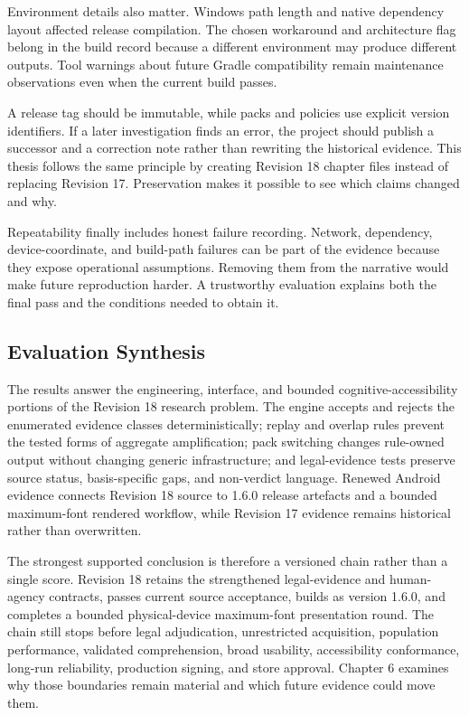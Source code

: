 Environment details also matter. Windows path length and native dependency layout affected release compilation. The chosen workaround and architecture flag belong in the build record because a different environment may produce different outputs. Tool warnings about future Gradle compatibility remain maintenance observations even when the current build passes.

A release tag should be immutable, while packs and policies use explicit version identifiers. If a later investigation finds an error, the project should publish a successor and a correction note rather than rewriting the historical evidence. This thesis follows the same principle by creating Revision 18 chapter files instead of replacing Revision 17. Preservation makes it possible to see which claims changed and why.

Repeatability finally includes honest failure recording. Network, dependency, device-coordinate, and build-path failures can be part of the evidence because they expose operational assumptions. Removing them from the narrative would make future reproduction harder. A trustworthy evaluation explains both the final pass and the conditions needed to obtain it.

\subsection{Evaluation Synthesis}

The results answer the engineering, interface, and bounded cognitive-accessibility portions of the Revision 18 research problem. The engine accepts and rejects the enumerated evidence classes deterministically; replay and overlap rules prevent the tested forms of aggregate amplification; pack switching changes rule-owned output without changing generic infrastructure; and legal-evidence tests preserve source status, basis-specific gaps, and non-verdict language. Renewed Android evidence connects Revision 18 source to 1.6.0 release artefacts and a bounded maximum-font rendered workflow, while Revision 17 evidence remains historical rather than overwritten.

The strongest supported conclusion is therefore a versioned chain rather than a single score. Revision 18 retains the strengthened legal-evidence and human-agency contracts, passes current source acceptance, builds as version 1.6.0, and completes a bounded physical-device maximum-font presentation round. The chain still stops before legal adjudication, unrestricted acquisition, population performance, validated comprehension, broad usability, accessibility conformance, long-run reliability, production signing, and store approval. Chapter 6 examines why those boundaries remain material and which future evidence could move them.
